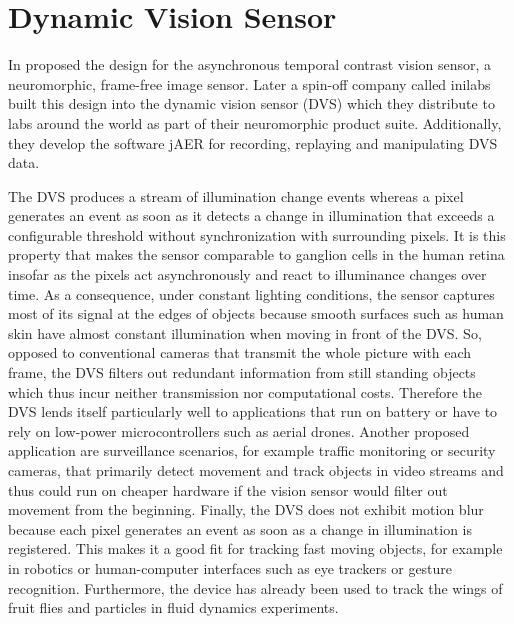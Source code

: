 \chapter{Dynamic Vision Sensor}
\label{cha:dvs}

In \citeyear{dvs} \citeauthor{dvs} proposed the design for the asynchronous
temporal contrast vision sensor, a neuromorphic, frame-free image sensor. Later
a spin-off company called inilabs built this design into the dynamic vision
sensor (DVS) which they distribute to labs around the world as part of their
neuromorphic product suite. Additionally, they develop the software jAER for
recording, replaying and manipulating DVS data.

The DVS produces a stream of illumination change events whereas a pixel
generates an event as soon as it detects a change in illumination that exceeds a
configurable threshold without synchronization with surrounding pixels. It is
this property that makes the sensor comparable to ganglion cells in the human
retina insofar as the pixels act asynchronously and react to illuminance changes
over time. As a consequence, under constant lighting conditions, the sensor
captures most of its signal at the edges of objects because smooth surfaces such
as human skin have almost constant illumination when moving in front of the DVS.
So, opposed to conventional cameras that transmit the whole picture with each
frame, the DVS filters out redundant information from still standing objects
which thus incur neither transmission nor computational costs. Therefore the DVS
lends itself particularly well to applications that run on battery or have to
rely on low-power microcontrollers such as aerial drones. Another proposed
application are surveillance scenarios, for example traffic monitoring or
security cameras, that primarily detect movement and track objects in video
streams and thus could run on cheaper hardware if the vision sensor would filter
out movement from the beginning. Finally, the DVS does not exhibit motion blur
because each pixel generates an event as soon as a change in illumination is
registered. This makes it a good fit for tracking fast moving objects, for
example in robotics or human-computer interfaces such as eye trackers or gesture
recognition. Furthermore, the device has already been used to track the wings of
fruit flies and particles in fluid dynamics experiments.

